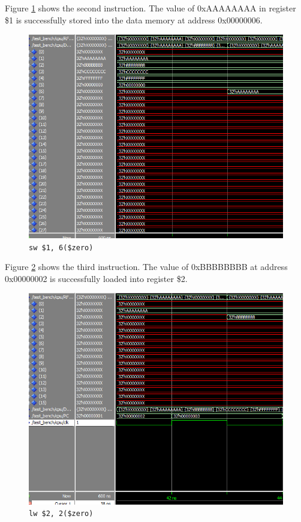 \documentclass[12pt]{article}
\begin{document}
Figure \ref{fig:2-instr} shows the second instruction. The value of 0xAAAAAAAA in register \$1 is successfully stored into the data memory at address 0x00000006.
\begin{figure}[H]
\centering
\includegraphics[width=\linewidth]{simulation/2-instr}
\caption{\texttt{sw \$1, 6(\$zero)}}
\label{fig:2-instr}
\end{figure}

Figure \ref{fig:3-instr} shows the third instruction. The value of 0xBBBBBBBB at address 0x00000002 is successfully loaded into register \$2.
\begin{figure}[H]
\centering
\includegraphics[width=\linewidth]{simulation/3-instr}
\caption{\texttt{lw \$2, 2(\$zero)}}
\label{fig:3-instr}
\end{figure}
\end{document}
